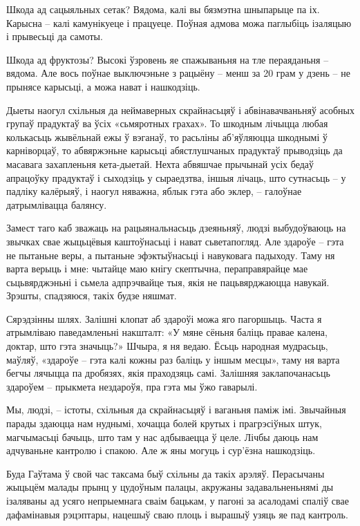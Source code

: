 Шкода ад сацыяльных сетак? Вядома, калі вы бязмэтна шныпарыце па іх. Карысна – калі камунікуеце і працуеце. Поўная адмова можа паглыбіць ізаляцыю і прывесьці да самоты.

Шкода ад фруктозы? Высокі ўзровень яе спажываньня на тле пераяданьня – вядома. Але вось поўнае выключэньне з рацыёну – менш за 20 грам у дзень – не прынясе карысьці, а можа нават і нашкодзіць.

Дыеты наогул схільныя да неймаверных скрайнасьцяў і абвінавачваньняў асобных групаў прадуктаў ва ўсіх «сьмяротных грахах». То шкодным лічыцца любая колькасьць жывёльнай ежы ў вэганаў, то расьліны аб'яўляюцца шкоднымі ў карніворцаў, то абвяржэньне карысьці абястлушчаных прадуктаў прыводзіць да масавага захапленьня кета-дыетай. Нехта абвяшчае прычынай усіх бедаў апрацоўку прадуктаў і сыходзіць у сыраедзтва, іншыя лічаць, што сутнасьць – у падліку калёрыяў, і наогул няважна, яблык гэта або эклер, – галоўнае датрымлівацца балянсу.

Замест таго каб зважаць на рацыянальнасьць дзеяньняў, людзі выбудоўваюць на звычках свае жыцьцёвыя каштоўнасьці і нават сьветапогляд. Але здароўе – гэта не пытаньне веры, а пытаньне эфэктыўнасьці і навуковага падыходу. Таму ня варта верыць і мне: чытайце маю кнігу скептычна, пераправярайце мае сьцьвярджэньні і сьмела адпрэчвайце тыя, якія не пацьвярджаюцца навукай. Зрэшты, спадзяюся, такіх будзе няшмат.

Сярэдзінны шлях. Залішні клопат аб здароўі можа яго пагоршыць. Часта я атрымліваю паведамленьні накшталт: «У мяне сёньня баліць правае калена, доктар, што гэта значыць?» Шчыра, я ня ведаю. Ёсьць народная мудрасьць, маўляў, «здароўе – гэта калі кожны раз баліць у іншым месцы», таму ня варта бегчы лячыцца па дробязях, якія праходзяць самі. Залішняя заклапочанасьць здароўем – прыкмета нездароўя, пра гэта мы ўжо гаварылі.

Мы, людзі, – істоты, схільныя да скрайнасьцяў і ваганьня паміж імі. Звычайныя парады здаюцца нам нуднымі, хочацца болей крутых і прагрэсіўных штук, магчымасьці бачыць, што там у нас адбываецца ў целе. Лічбы даюць нам адчуваньне кантролю і спакою. Але ж яны могуць і сур'ёзна нашкодзіць.

Буда Гаўтама ў свой час таксама быў схільны да такіх арэляў. Перасычаны жыцьцём малады прынц у цудоўным палацы, акружаны задавальненьнямі ды ізаляваны ад усяго непрыемнага сваім бацькам, у пагоні за асалодамі спаліў свае дафамінавыя рэцэптары, нацешыў сваю плоць і вырашыў узяць яе пад кантроль.

